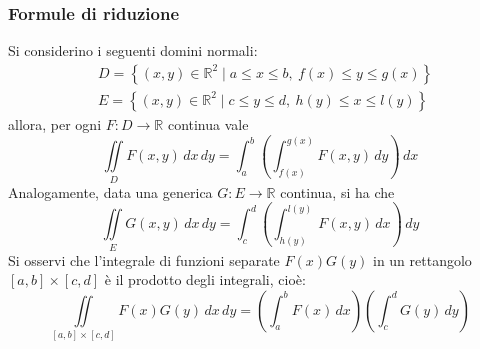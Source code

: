 \subsubsection{Formule di riduzione}
Si considerino i seguenti domini normali:
    \begin{align}
    &D= \left\{ (x, y) \in \mathbb{R}^2 \mid a \leq x \leq b ,\ f(x)\leq y \leq g(x) \right\}\\
    &E= \left\{(x, y) \in \mathbb{R}^2\mid c \leq y \leq d,\ h(y) \leq x \leq l(y)\right\}
    \end{align}
allora, per ogni $F: D \to \mathbb{R}$ continua vale
\begin{equation} \label{Eq: Formula di riduzione integrali doppi 1}
\iint\limits_{D} F(x,y)\,dx\,dy = \int_{a}^{b}{\left(\int_{f(x)}^{g(x)}{F(x,y)\,dy}\right)\,dx }
\end{equation}
Analogamente, data una generica $G: E \to \mathbb{R}$ continua, si ha che
\begin{equation} \label{Eq: Formula di riduzione integrali doppi 2}
    \iint\limits_{E} G(x,y)\,dx\,dy = \int_{c}^{d}{\left(\int_{h(y)}^{l(y)}{F(x,y)\,dx}\right)\,dy }
\end{equation}
Si osservi che l'integrale di funzioni separate $F(x)G(y)$ in un rettangolo $ \left[a,b \right] \times \left[c,d\right]$ è il prodotto degli integrali, cioè:
\begin{equation} \label{Eq: Integrale doppio di funzioni separate}
    \iint\limits_{\left[a,b \right] \times \left[c,d\right]}{F(x)G(y)}\,dx\,dy = \left(\int_{a}^{b}{F(x)}\,dx \right)\left(\int_{c}^{d}{G(y)}\,dy \right)
\end{equation}
